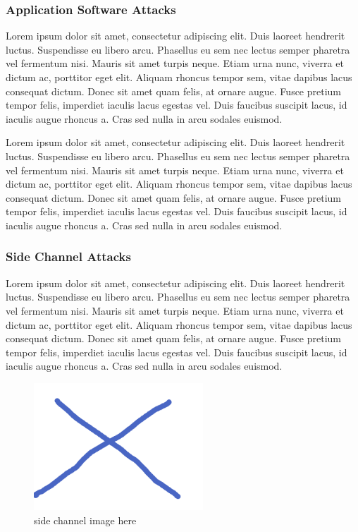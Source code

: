 \documentclass[final,conference,11pt]{IEEEtran}
\begin{document}
\subsubsection{Application Software Attacks}
Lorem ipsum dolor sit amet, consectetur adipiscing elit. Duis laoreet hendrerit luctus. Suspendisse eu libero arcu. Phasellus eu sem nec lectus semper pharetra vel fermentum nisi. Mauris sit amet turpis neque. Etiam urna nunc, viverra et dictum ac, porttitor eget elit. Aliquam rhoncus tempor sem, vitae dapibus lacus consequat dictum. Donec sit amet quam felis, at ornare augue. Fusce pretium tempor felis, imperdiet iaculis lacus egestas vel. Duis faucibus suscipit lacus, id iaculis augue rhoncus a. Cras sed nulla in arcu sodales euismod.

Lorem ipsum dolor sit amet, consectetur adipiscing elit. Duis laoreet hendrerit luctus. Suspendisse eu libero arcu. Phasellus eu sem nec lectus semper pharetra vel fermentum nisi. Mauris sit amet turpis neque. Etiam urna nunc, viverra et dictum ac, porttitor eget elit. Aliquam rhoncus tempor sem, vitae dapibus lacus consequat dictum. Donec sit amet quam felis, at ornare augue. Fusce pretium tempor felis, imperdiet iaculis lacus egestas vel. Duis faucibus suscipit lacus, id iaculis augue rhoncus a. Cras sed nulla in arcu sodales euismod.

\subsubsection{Side Channel Attacks}
Lorem ipsum dolor sit amet, consectetur adipiscing elit. Duis laoreet hendrerit luctus. Suspendisse eu libero arcu. Phasellus eu sem nec lectus semper pharetra vel fermentum nisi. Mauris sit amet turpis neque. Etiam urna nunc, viverra et dictum ac, porttitor eget elit. Aliquam rhoncus tempor sem, vitae dapibus lacus consequat dictum. Donec sit amet quam felis, at ornare augue. Fusce pretium tempor felis, imperdiet iaculis lacus egestas vel. Duis faucibus suscipit lacus, id iaculis augue rhoncus a. Cras sed nulla in arcu sodales euismod.

\begin{figure}[!t]
\centering
\includegraphics[width=2.5in]{topology}
\caption{side channel image here}
\label{fig:side_chan}
\end{figure}
\end{document}
